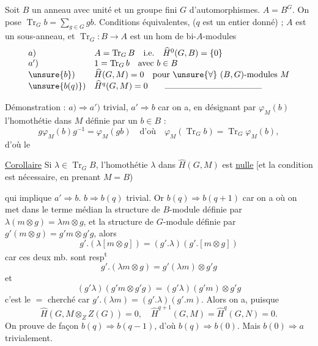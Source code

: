 Soit $B$ un anneau avec unité et un groupe fini $G$ d'automorphismes. $A=B^G$. On pose $\operatorname{Tr}_G b=\sum_{g\in G}gb$. Conditions équivalentes, ($q$ est un entier donné) ; $A$ est un sous-anneau, et $\operatorname{Tr}_G:B\longrightarrow A$ est un hom de bi-$A$-modules
\[
\begin{array}{ll}
a)&A=\operatorname{Tr}_G B\quad\text{i.e.}\quad\widehat H^0(G,B)=\{0\}\\
a')&1=\operatorname{Tr}_G b\quad\text{avec }b\in B\\
\unsure{b})&\widehat H(G,M)=0\quad\text{pour }\unsure{\forall}\ (B,G)\text{-modules }M\\
\unsure{b(q)})&\widehat H^q(G,M)=0\qquad\rule{4cm}{.3pt}
\end{array}
\]

Démonstration : $a)\Rightarrow a')$ trivial, $a'\Rightarrow b$ car on a, en désignant par $\varphi_M(b)$ l'homothétie dans $M$ définie par un $b\in B$ :
\[
g\varphi_M(b)g^{-1}=\varphi_M(gb)\quad\text{d'où}\quad\varphi_M(\operatorname{Tr}_G b)=\operatorname{Tr}_G\varphi_M(b),
\]
d'où le

\uline{Corollaire} Si $\lambda\in\operatorname{Tr}_G B$, l'homothétie $\lambda$ dans $\widehat H(G,M)$ est \uline{nulle}
[et la condition est  nécessaire, en prenant $M=B$)

qui implique $a'\Rightarrow b$. $b\Rightarrow b(q)$ trivial. Or $b(q)\Rightarrow b(q+1)$ car on a
où on met dans le terme médian la  structure de $B$-module définie par $\lambda(m\otimes g)=\lambda m\otimes g$, et la structure de $G$-module définie par $g'(m\otimes g)=g'm\otimes g'g$, alors
\[
g'.(\lambda[m\otimes g])=(g'.\lambda)(g'.[m\otimes g])
\]
car ces deux mb. sont resp\textsuperscript{t}
\[
g'.(\lambda m\otimes g)=g'(\lambda m)\otimes g'g
\]
et
\[
(g'\lambda)(g'm\otimes g'g)=(g'\lambda)(g'm)\otimes g'g
\]
c'est le $=$ cherché car $g'.(\lambda m)=(g'.\lambda)(g'.m)$. Alors on a, puisque
\[
\widehat H(G,M\otimes_Z Z(G))=0,\quad\widehat H^{q+1}(G,M)=\widehat H^q(G,N)=0.
\]
On prouve de façon  $b(q)\Rightarrow b(q-1)$, d'où $b(q)\Rightarrow b(0)$. Mais $b(0)\Rightarrow a$ trivialement.

